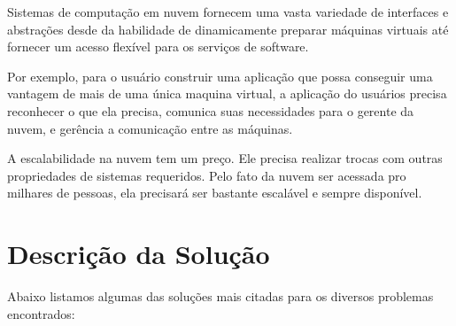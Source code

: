 \documentclass{llncs}
\begin{document}
Sistemas de computação em nuvem fornecem uma vasta variedade de interfaces e abstrações desde da habilidade de dinamicamente preparar máquinas virtuais até fornecer um acesso flexível para os serviços de software.

Por exemplo, para o usuário construir uma aplicação que possa conseguir uma vantagem de mais de uma única maquina virtual, a aplicação do usuários precisa reconhecer o que ela precisa, comunica suas necessidades para o gerente da nuvem, e gerência a comunicação entre as máquinas.\cite{wentz}

A escalabilidade na nuvem tem um preço. Ele precisa realizar trocas com outras propriedades de sistemas requeridos. Pelo fato da nuvem ser acessada pro milhares de pessoas, ela precisará ser bastante escalável e sempre disponível.\cite{liu}

\section{Descrição da Solução}
Abaixo listamos algumas das soluções mais citadas para os diversos problemas encontrados:
\end{document}
